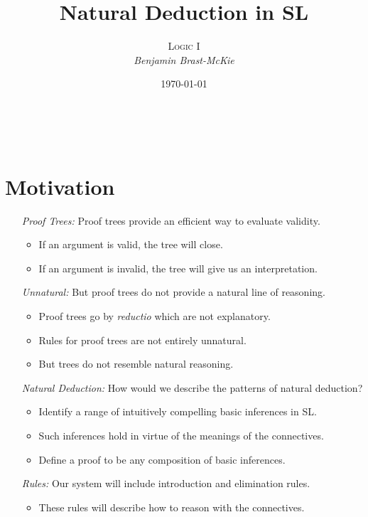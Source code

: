 \documentclass[a4paper, 11pt]{article} %
\title{\textbf{Natural Deduction in SL}} %
\author{\textsc{Logic I}\\ \em Benjamin Brast-McKie} %
\date{\today} %
\makeatletter
\renewcommand{\maketitle}{ %
\begin{flushright} %
{\LARGE\@title} %

\vspace{10pt} %

{\@author} %
\\\@date %

\vspace{-10pt} %
\end{flushright}
}
\makeatother
\begin{document}
\maketitle %

\thispagestyle{empty}


\section*{Motivation}

\begin{enumerate}
  \item[\it Proof Trees:] Proof trees provide an efficient way to evaluate validity.
    \begin{itemize}
      \item If an argument is valid, the tree will close.
      \item If an argument is invalid, the tree will give us an interpretation.
    \end{itemize}
  \item[\it Unnatural:] But proof trees do not provide a natural line of reasoning.
    \begin{itemize}
      \item Proof trees go by \textit{reductio} which are not explanatory.
      \item Rules for proof trees are not entirely unnatural.
      \item But trees do not resemble natural reasoning.
    \end{itemize}
  \item[\it Natural Deduction:] How would we describe the patterns of natural deduction?
    \begin{itemize}
      \item Identify a range of intuitively compelling basic inferences in SL.
      \item Such inferences hold in virtue of the meanings of the connectives.
      \item Define a proof to be any composition of basic inferences.
    \end{itemize}
  \item[\it Rules:] Our system will include introduction and elimination rules.
    \begin{itemize}
      \item These rules will describe how to reason with the connectives.
    \end{itemize}
\end{enumerate}
\end{document}
